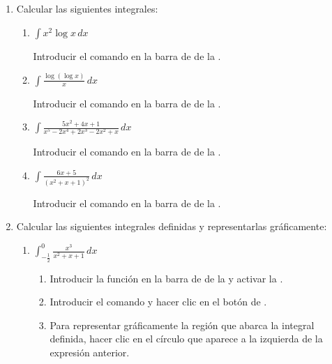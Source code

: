 \begin{enumerate}[leftmargin=*]
\item Calcular las siguientes integrales:
      \begin{enumerate}
      \item $ \int{x^2 \log x\,dx}$
            \begin{indication}
            Introducir el comando  en la barra de  de la .
            \end{indication}

      \item $\displaystyle \int \frac{\log(\log x)}{x}\,dx$
            \begin{indication}
            Introducir el comando  en la barra de  de la .
            \end{indication}

      \item $\displaystyle \int \frac{5x^{2}+4x+1}{x^{5}-2x^{4}+2x^{3}-2x^{2}+x}\,dx$
            \begin{indication}
            Introducir el comando  en la barra de  de la .
            \end{indication}

      \item $\displaystyle \int \frac{6x+5}{(x^{2}+x+1)^{2}}\,dx$
            \begin{indication}
            Introducir el comando  en la barra de  de la .
            \end{indication}
      \end{enumerate}


\item Calcular las siguientes integrales definidas y representarlas gráficamente:
      \begin{enumerate}
      \item $\displaystyle \int_{-\frac{1}{2}}^0 \frac{x^{3}}{x^{2}+x+1}\,dx$
            \begin{indication}
            \begin{enumerate}
            \item Introducir la función  en la barra de  de la  y activar la .
            \item Introducir el comando  y hacer clic en el botón de .
            \item Para representar gráficamente la región que abarca la integral definida, hacer clic en el círculo que aparece a la izquierda de la expresión anterior.
            \end{enumerate}
            \end{indication}


\end{enumerate}
\end{enumerate}
